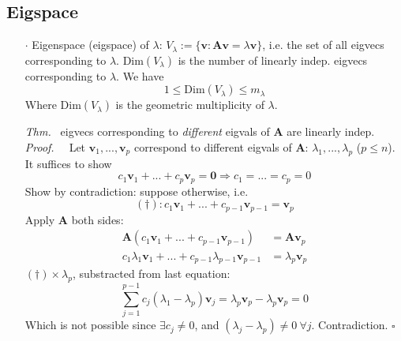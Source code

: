 \documentclass[a4paper, 11pt]{article}
\begin{document}
\subsection{Eigspace}
\begin{itemize}
  \item[$\cdot$] Eigenspace (eigspace) of $\lambda$: $V_{\lambda}:=\{\bm{v}: \bm{A}\bm{v}=\lambda \bm{v}\}$, i.e. the set of all eigvecs corresponding to $\lambda$. $\text{Dim}(V_{\lambda})$ is the number of linearly indep. eigvecs corresponding to $\lambda$. We have
  $$
  1\leq \text{Dim}(V_{\lambda})\leq m_{\lambda}
  $$
  Where $\text{Dim}(V_{\lambda})$ is the geometric multiplicity of $\lambda$.
  \item[\textit{Thm.~}] eigvecs corresponding to \textit{different} eigvals of $\bm{A}$ are linearly indep.\\
  \textit{Proof.~~} Let $\bm{v}_1, ..., \bm{v}_p$ correspond to different eigvals of $\bm{A}$: $\lambda_1, ..., \lambda_p$ ($p\leq n$).\\
  It suffices to show
  $$
  c_1 \bm{v}_1 + ... + c_p \bm{v}_p= \bm{0} \Rightarrow c_1=...=c_p=0
  $$
  Show by contradiction: suppose otherwise, i.e. 
  $$
  (\dag): c_1 \bm{v}_1 + ... + c_{p-1} \bm{v}_{p-1}= \bm{v}_p
  $$
  Apply $\bm{A}$ both sides:
  \begin{equation*}
  \begin{split}
    \bm{A}(c_1 \bm{v}_1 + ... + c_{p-1} \bm{v}_{p-1}) &= \bm{A} \bm{v}_p\\
    c_1 \lambda_1 \bm{v}_1 + ... + c_{p-1} \lambda_{p-1} \bm{v}_{p-1} &= \lambda_p \bm{v}_p
  \end{split}
  \end{equation*}
  $(\dag)\times \lambda_p$, substracted from last equation:
  $$
  \sum_{j=1}^{p-1}c_j (\lambda_1 - \lambda_p)\bm{v}_j = \lambda_p \bm{v}_p - \lambda_p \bm{v}_p = 0
  $$
  Which is not possible since $\exists c_j \ne 0$, and $(\lambda_j - \lambda_p)\ne 0~\forall j$. Contradiction. $\square$
\end{itemize}
\end{document}
